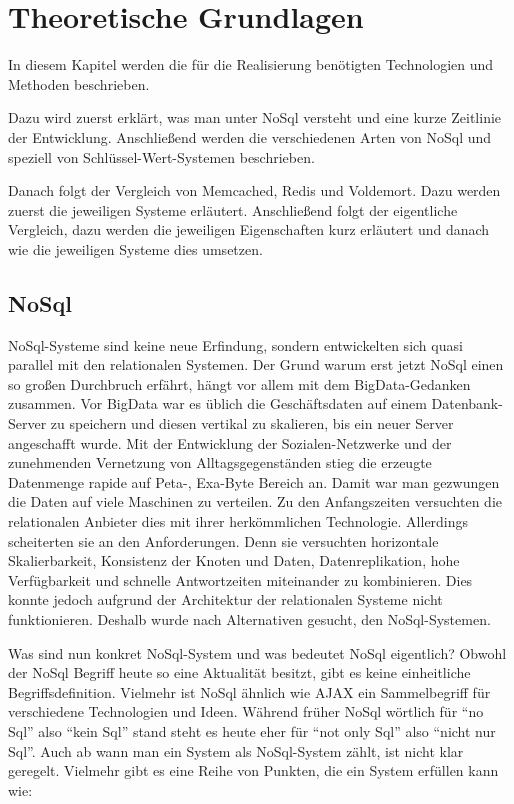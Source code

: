 \chapter{Theoretische Grundlagen}
In diesem Kapitel werden die für die Realisierung benötigten Technologien und
Methoden beschrieben.

Dazu wird zuerst erklärt, was man unter NoSql versteht und eine kurze Zeitlinie
der Entwicklung. Anschließend werden die verschiedenen Arten von NoSql und
speziell von Schlüssel-Wert-Systemen beschrieben.

Danach folgt der Vergleich von Memcached, Redis und Voldemort. Dazu werden
zuerst die jeweiligen Systeme erläutert. Anschließend folgt der eigentliche
Vergleich, dazu werden die jeweiligen Eigenschaften kurz erläutert und danach
wie die jeweiligen Systeme dies umsetzen.

\section{NoSql}
NoSql-Systeme sind keine neue Erfindung, sondern entwickelten sich quasi
parallel mit den relationalen Systemen. Der Grund warum erst jetzt NoSql einen
so großen Durchbruch erfährt, hängt vor allem mit dem \gls{BigData}-Gedanken
zusammen. Vor BigData war es üblich die Geschäftsdaten auf einem
Datenbank-Server zu speichern und diesen vertikal zu skalieren, bis ein neuer
Server angeschafft wurde. Mit der Entwicklung der Sozialen-Netzwerke und der
zunehmenden Vernetzung von Alltagsgegenständen stieg die erzeugte Datenmenge
rapide auf Peta-, Exa-Byte Bereich an. Damit war man gezwungen die Daten auf
viele Maschinen zu verteilen. Zu den Anfangszeiten versuchten die relationalen
Anbieter dies mit ihrer herkömmlichen Technologie. Allerdings scheiterten sie an
den Anforderungen. Denn sie versuchten horizontale Skalierbarkeit, Konsistenz
der Knoten und Daten, Datenreplikation, hohe Verfügbarkeit und schnelle
Antwortzeiten miteinander zu kombinieren. Dies konnte jedoch aufgrund der
Architektur der relationalen Systeme nicht funktionieren. Deshalb wurde nach
Alternativen gesucht, den NoSql-Systemen.

Was sind nun konkret NoSql-System und was bedeutet NoSql eigentlich? Obwohl der
NoSql Begriff heute so eine Aktualität besitzt, gibt es keine einheitliche
Begriffsdefinition. Vielmehr ist NoSql ähnlich wie \gls{AJAX} ein Sammelbegriff
für verschiedene Technologien und Ideen. Während früher NoSql wörtlich
für \enquote{no Sql} also \enquote{kein Sql} stand steht es heute eher für
\enquote{not only Sql} also \enquote{nicht nur Sql}. Auch ab wann man ein System
als NoSql-System zählt, ist nicht klar geregelt. Vielmehr gibt es eine Reihe von
Punkten, die ein System erfüllen kann wie: \cite{Edlich2011}

